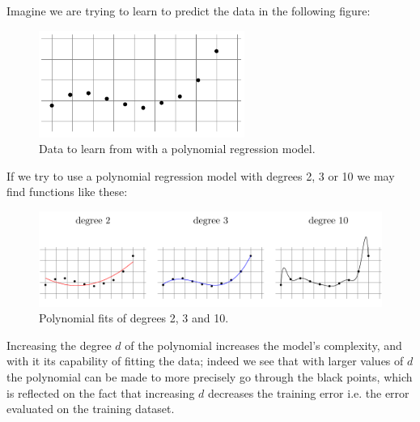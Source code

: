 Imagine we are trying to learn to predict the data in the following figure:
\begin{figure}[H]
    \centering
    \includegraphics[width=0.6\textwidth]{img/polinomio_dati.png}
    \caption{Data to learn from with a polynomial regression model.}
\end{figure}
If we try to use a polynomial regression model with degrees 2, 3 or 10 we may find functions like these:
\begin{figure}[H]
    \centering
    \includegraphics[width=1.0\textwidth]{img/polinomio_fit.png}
    \caption{Polynomial fits of degrees 2, 3 and 10.}
\end{figure}
Increasing the degree $d$ of the polynomial increases the model's complexity, and with it its capability of fitting the data; indeed we see that with larger values of $d$ the polynomial can be made to more precisely go through the black points, which is reflected on the fact that increasing $d$ decreases the training error i.e. the error evaluated on the training dataset.

